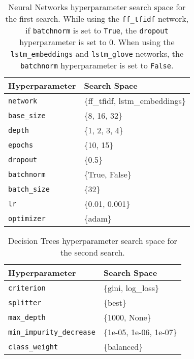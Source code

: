 \begin{table}[H]
\centering
\begin{tabularx}{0.48\textwidth}{|l|X|}
\hline
Hyperparameter & Search Space \\
\hline
\texttt{network} & \{ff\_tfidf, lstm\_embeddings\} \\
\texttt{base\_size} & \{8, 16, 32\} \\
\texttt{depth} & \{1, 2, 3, 4\} \\
\texttt{epochs} & \{10, 15\} \\
\texttt{dropout} & \{0.5\} \\
\texttt{batchnorm} & \{True, False\} \\
\texttt{batch\_size} & \{32\} \\
\texttt{lr} & \{0.01, 0.001\} \\
\texttt{optimizer} & \{adam\} \\
\hline
\end{tabularx}
\caption{Neural Networks hyperparameter search space for the first search. While using the \texttt{ff\_tfidf} network, if \texttt{batchnorm} is set to \texttt{True}, the \texttt{dropout} hyperparameter is set to $0$. When using the \texttt{lstm\_embeddings} and \texttt{lstm\_glove} networks, the \texttt{batchnorm} hyperparameter is set to \texttt{False}.}
\label{tab:hyperparameters_neural_network_0}

\end{table}


\begin{table}[H]
\centering
\begin{tabularx}{0.48\textwidth}{|l|X|}
\hline
Hyperparameter & Search Space \\
\hline
\texttt{criterion} & \{gini, log\_loss\} \\
\texttt{splitter} & \{best\} \\
\texttt{max\_depth} & \{1000, None\} \\
\texttt{min\_impurity\_decrease} & \{1e-05, 1e-06, 1e-07\} \\
\texttt{class\_weight} & \{balanced\} \\
\hline
\end{tabularx}
\caption{Decision Trees hyperparameter search space for the second search.}
\label{tab:hyperparameters_decision_tree_1}

\end{table}


